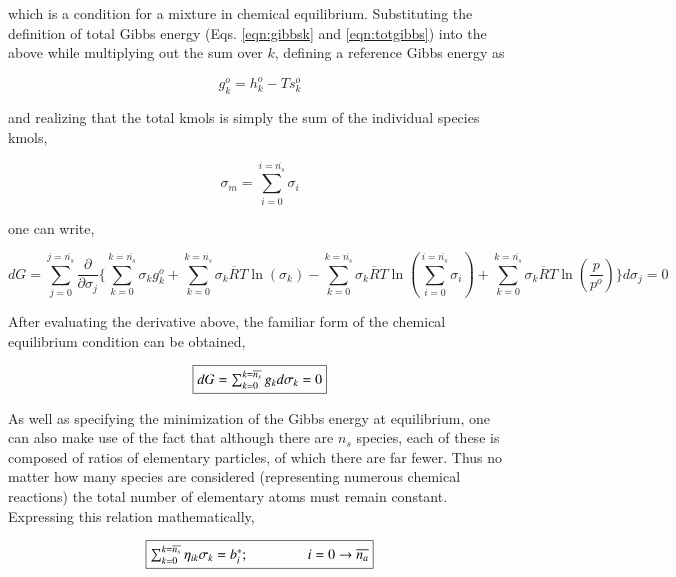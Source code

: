 	which is a condition for a mixture in chemical equilibrium.  Substituting the
definition of total Gibbs energy (Eqs. \ref{eqn:gibbsk} and \ref{eqn:totgibbs}) into the above while
multiplying out the sum over $k$, defining a reference Gibbs energy as

\begin{equation}
	g_k^o=h_k^o -Ts_k^o
\label{eqn:gibbsk2}
\end{equation}

	and realizing that the total kmols is simply the sum of the individual species kmols,

\begin{equation}
	\sigma_m = \sum_{i=0}^{i=\overline{n_s}}\sigma_i
\label{eqn:sumkmol}
\end{equation}

	one can write,

\begin{displaymath}
	dG=\sum_{j=0}^{j=\overline{n_s}} \frac{\partial}{\partial \sigma_j}\Bigg\{ 
	\sum_{k=0}^{k=\overline{n_s}} \sigma_k g^o_k + \sum_{k=0}^{k=\overline{n_s}} \sigma_k \overline{R}T \ln(\sigma_k) 
	- \sum_{k=0}^{k=\overline{n_s}} \sigma_k \overline{R}T \ln (\sum_{i=0}^{i=\overline{n_s}} \sigma_i) + 
	\sum_{k=0}^{k=\overline{n_s}} \sigma_k \overline{R}T \ln(\frac{p}{p^o})\Bigg\}d\sigma_j=0
\end{displaymath}

	After evaluating the derivative above, the familiar form of the chemical equilibrium condition
can be obtained,

\begin{equation}
	\fbox{$
	dG = \sum_{k=0}^{k=\overline{n_s}}g_k d\sigma_k = 0
	$}
\label{eqn:equibcond}
\end{equation}


	As well as specifying the minimization of the Gibbs energy at equilibrium, one can 
also make use of the fact that although there are $n_s$ species, each of these is composed
of ratios of elementary particles, of which there are far fewer.  Thus no matter how many 
species are considered (representing numerous chemical reactions) the total number of elementary
atoms must remain constant.  Expressing this relation mathematically,

\begin{equation}
	\fbox{$
	\sum_{k=0}^{k=\overline{n_s}}\eta_{ik}\sigma_k = b_i^*; \hspace{15mm} i=0 \rightarrow \overline{n_a}
	$}
\label{eqn:totatoms}
\end{equation}	

